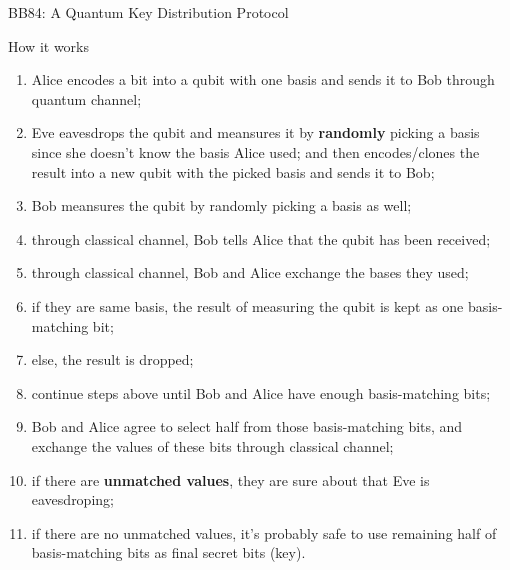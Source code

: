 \documentclass{beamer}
\begin{document}
\begin{frame}{BB84: A Quantum Key Distribution Protocol}
  \begin{block}{How it works}
  {\scriptsize
    \begin{enumerate}[I]
      \item Alice encodes a bit into a qubit with one basis and sends it to Bob through quantum channel;
      \item Eve eavesdrops the qubit and meansures it by \textbf{randomly} picking a basis since she doesn't know the basis Alice used; and then encodes/clones the result into a new qubit with the picked basis and sends it to Bob;
      \item Bob meansures the qubit by randomly picking a basis as well;
      \item through classical channel, Bob tells Alice that the qubit has been received;
      \item through classical channel, Bob and Alice exchange the bases they used;
      \item if they are same basis, the result of measuring the qubit is kept as one basis-matching bit;
      \item else, the result is dropped;
      \item continue steps above until Bob and Alice have enough basis-matching bits;
      \item Bob and Alice agree to select half from those basis-matching bits, and exchange the values of these bits through classical channel;
      \item if there are \textbf{unmatched values}, they are sure about that Eve is eavesdroping;
      \item if there are no unmatched values, it's probably safe to use remaining half of basis-matching bits as final secret bits (key).
    \end{enumerate}
  }%
  \end{block}
\end{frame}
\end{document}
